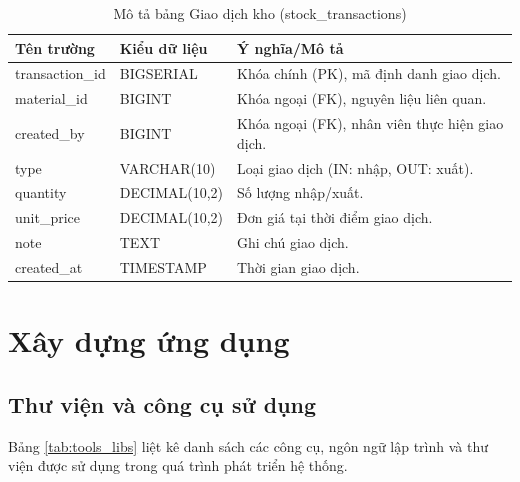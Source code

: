 \documentclass[../20232006p.tex]{subfiles}
\begin{document}
\begin{table}[H]
    \centering
    \caption{Mô tả bảng Giao dịch kho (stock\_transactions)}
    \label{tab:stock_transactions}
    \begin{tabular}{|p{3cm}|p{3cm}|p{8cm}|}
        \hline
        \textbf{Tên trường} & \textbf{Kiểu dữ liệu} & \textbf{Ý nghĩa/Mô tả}                          \\
        \hline
        transaction\_id     & BIGSERIAL             & Khóa chính (PK), mã định danh giao dịch.        \\
        \hline
        material\_id        & BIGINT                & Khóa ngoại (FK), nguyên liệu liên quan.         \\
        \hline
        created\_by         & BIGINT                & Khóa ngoại (FK), nhân viên thực hiện giao dịch. \\
        \hline
        type                & VARCHAR(10)           & Loại giao dịch (IN: nhập, OUT: xuất).           \\
        \hline
        quantity            & DECIMAL(10,2)         & Số lượng nhập/xuất.                             \\
        \hline
        unit\_price         & DECIMAL(10,2)         & Đơn giá tại thời điểm giao dịch.                \\
        \hline
        note                & TEXT                  & Ghi chú giao dịch.                              \\
        \hline
        created\_at         & TIMESTAMP             & Thời gian giao dịch.                            \\
        \hline
    \end{tabular}
\end{table}





\section{Xây dựng ứng dụng}
\subsection{Thư viện và công cụ sử dụng}

Bảng \ref{tab:tools_libs} liệt kê danh sách các công cụ, ngôn ngữ lập trình và thư viện được sử dụng trong quá trình phát triển hệ thống.
\end{document}
